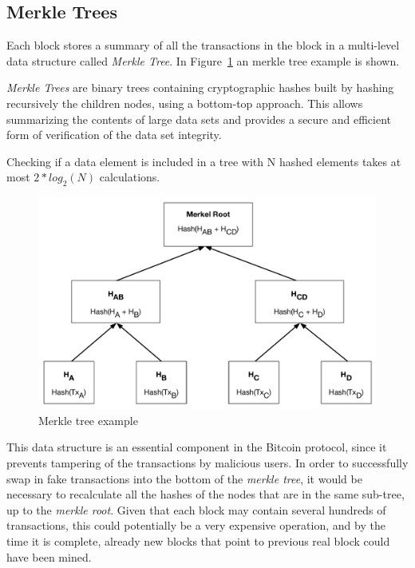 \subsection{Merkle Trees}
Each block stores a summary of all the transactions in the block in a multi-level data structure called \textit{Merkle Tree}.
In Figure~\ref{fig:merkle-tree} an merkle tree example is shown.

\textit{Merkle Trees} are binary trees containing cryptographic hashes built by hashing recursively the children nodes, using a bottom-top approach.
This allows summarizing the contents of large data sets and provides a secure and efficient form of verification of the data set integrity.

Checking if a data element is included in a tree with N hashed elements takes at most \(2*log_2(N)\) calculations.

\begin{figure}[htb]
  \centering
  \includegraphics[scale=0.5]{Figures/merkle-tree.pdf}
  \caption{Merkle tree example}
\label{fig:merkle-tree}
\end{figure}

This data structure is an essential component in the Bitcoin protocol, since it prevents tampering of the transactions by malicious users. In order to successfully swap in fake transactions into the bottom of the \textit{merkle tree}, it would be necessary to recalculate all the hashes of the nodes that are in the same sub-tree, up to the \textit{merkle root}. Given that each block may contain several hundreds of transactions, this could potentially be a very expensive operation, and by the time it is complete, already new blocks that point to previous real block could have been mined.

